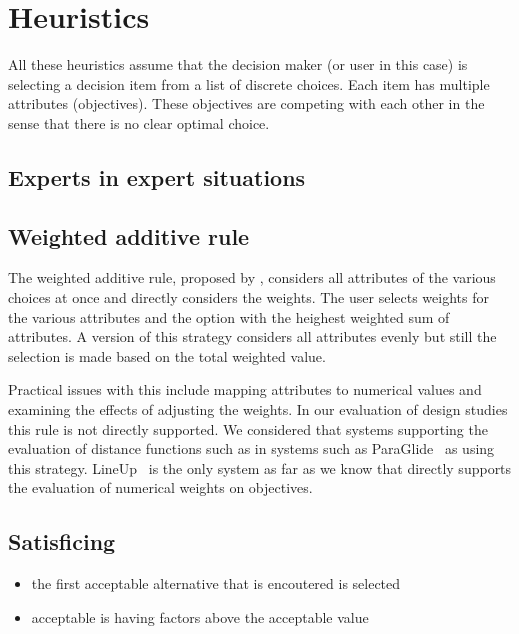 \section{Heuristics}\label{heuristics}

All these heuristics assume that the decision maker (or user in this case)
is selecting a decision item from a list of discrete choices. Each item
has multiple attributes (objectives). These objectives are competing with
each other in the sense that there is no clear optimal choice. 

\subsection{Experts in expert
situations}\label{experts-in-expert-situations}

\subsection{Weighted additive rule}\label{weighted-additive-rule}

The weighted additive rule, proposed by , considers all
attributes of the various choices at once and directly considers 
the weights. The user selects weights for the various attributes and 
the option with the heighest weighted sum of attributes.
A version of this strategy considers all attributes evenly but still
the selection is made based on the total weighted value.

Practical issues with this include mapping attributes to numerical values
and examining the effects of adjusting the weights. In our evaluation of
design studies this rule is not directly supported. We considered that
systems supporting the evaluation of distance functions such as 
in systems such as ParaGlide~\citep{Bergner:2013} as using this strategy.
LineUp~\citep{Gratzl:2013} is the only system as far as we know that
directly supports the evaluation of numerical weights on objectives.

\subsection{Satisficing}\label{satisficing}

\begin{itemize}
\tightlist
\item
  the first acceptable alternative that is encoutered is selected
\item
  acceptable is having factors above the acceptable value
\end{itemize}

